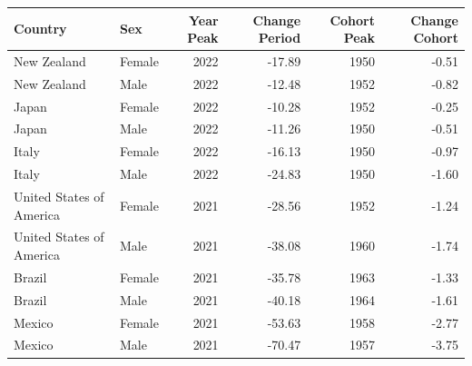 \begin{table}[ht]
\centering
\begin{tabular}{llrrrr}
  \hline
Country & Sex & Year Peak & Change Period & Cohort Peak & Change Cohort \\ 
  \hline
New Zealand & Female & 2022 & -17.89 & 1950 & -0.51 \\ 
  New Zealand & Male & 2022 & -12.48 & 1952 & -0.82 \\ 
  Japan & Female & 2022 & -10.28 & 1952 & -0.25 \\ 
  Japan & Male & 2022 & -11.26 & 1950 & -0.51 \\ 
  Italy & Female & 2022 & -16.13 & 1950 & -0.97 \\ 
  Italy & Male & 2022 & -24.83 & 1950 & -1.60 \\ 
  United States of America & Female & 2021 & -28.56 & 1952 & -1.24 \\ 
  United States of America & Male & 2021 & -38.08 & 1960 & -1.74 \\ 
  Brazil & Female & 2021 & -35.78 & 1963 & -1.33 \\ 
  Brazil & Male & 2021 & -40.18 & 1964 & -1.61 \\ 
  Mexico & Female & 2021 & -53.63 & 1958 & -2.77 \\ 
  Mexico & Male & 2021 & -70.47 & 1957 & -3.75 \\ 
   \hline
\end{tabular}
\end{table}
